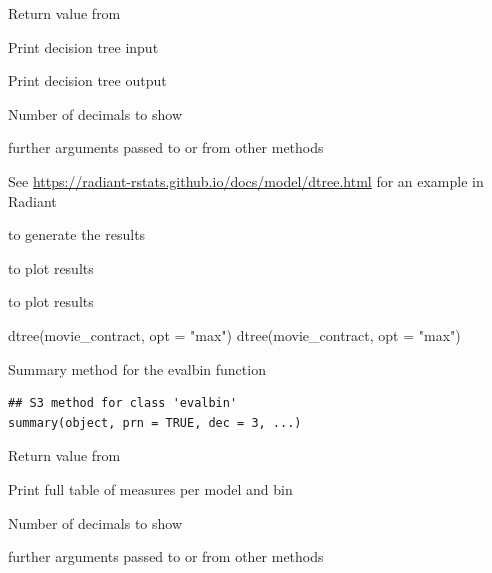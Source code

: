 \documentclass[a4paper]{book}
\begin{document}
\begin{Arguments}
\begin{ldescription}
\item[\code{object}] Return value from 

\item[\code{input}] Print decision tree input

\item[\code{output}] Print decision tree output

\item[\code{dec}] Number of decimals to show

\item[\code{...}] further arguments passed to or from other methods
\end{ldescription}
\end{Arguments}
%
\begin{Details}
See \url{https://radiant-rstats.github.io/docs/model/dtree.html} for an example in Radiant
\end{Details}
%
\begin{SeeAlso}
 to generate the results

 to plot results

 to plot results
\end{SeeAlso}
%
\begin{Examples}
\begin{ExampleCode}
dtree(movie_contract, opt = "max") %
dtree(movie_contract, opt = "max") %

\end{ExampleCode}
\end{Examples}
%
\begin{Description}
Summary method for the evalbin function
\end{Description}
%
\begin{Usage}
\begin{verbatim}
## S3 method for class 'evalbin'
summary(object, prn = TRUE, dec = 3, ...)
\end{verbatim}
\end{Usage}
%
\begin{Arguments}
\begin{ldescription}
\item[\code{object}] Return value from 

\item[\code{prn}] Print full table of measures per model and bin

\item[\code{dec}] Number of decimals to show

\item[\code{...}] further arguments passed to or from other methods
\end{ldescription}
\end{Arguments}
\end{document}
